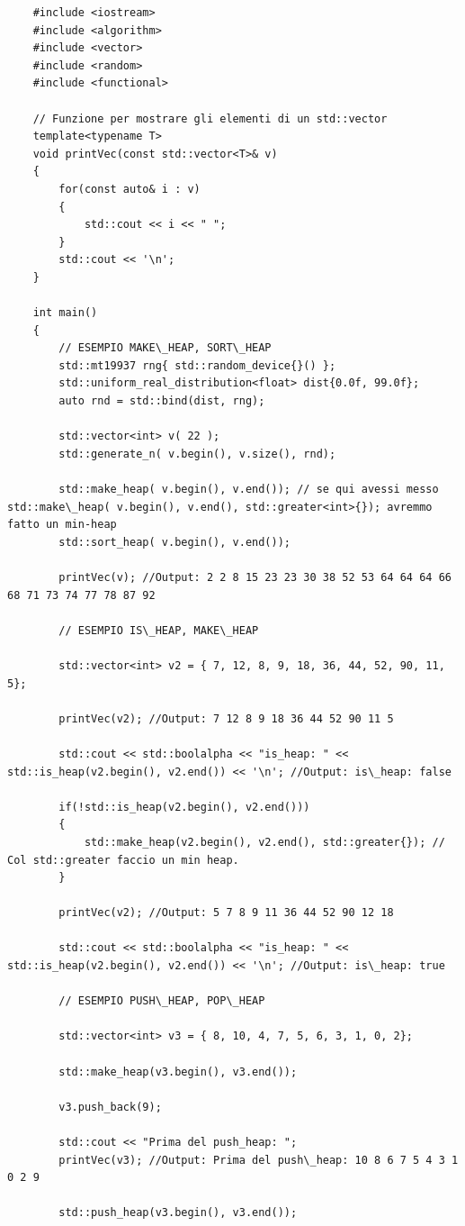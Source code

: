 \begin{lstlisting}
	#include <iostream>
	#include <algorithm>
	#include <vector>
	#include <random>
	#include <functional>
	
	// Funzione per mostrare gli elementi di un std::vector
	template<typename T>
	void printVec(const std::vector<T>& v)
	{
		for(const auto& i : v)
		{
			std::cout << i << " ";
		}
		std::cout << '\n';
	}
	
	int main()
	{
		// ESEMPIO MAKE\_HEAP, SORT\_HEAP
		std::mt19937 rng{ std::random_device{}() };
		std::uniform_real_distribution<float> dist{0.0f, 99.0f};
		auto rnd = std::bind(dist, rng);
		
		std::vector<int> v( 22 );
		std::generate_n( v.begin(), v.size(), rnd);
		
		std::make_heap( v.begin(), v.end()); // se qui avessi messo std::make\_heap( v.begin(), v.end(), std::greater<int>{}); avremmo fatto un min-heap
		std::sort_heap( v.begin(), v.end());
		
		printVec(v); //Output: 2 2 8 15 23 23 30 38 52 53 64 64 64 66 68 71 73 74 77 78 87 92
		
		// ESEMPIO IS\_HEAP, MAKE\_HEAP
		
		std::vector<int> v2 = { 7, 12, 8, 9, 18, 36, 44, 52, 90, 11, 5};
		
		printVec(v2); //Output: 7 12 8 9 18 36 44 52 90 11 5
		
		std::cout << std::boolalpha << "is_heap: " << std::is_heap(v2.begin(), v2.end()) << '\n'; //Output: is\_heap: false
		
		if(!std::is_heap(v2.begin(), v2.end()))
		{
			std::make_heap(v2.begin(), v2.end(), std::greater{}); // Col std::greater faccio un min heap.
		}
	
		printVec(v2); //Output: 5 7 8 9 11 36 44 52 90 12 18
	
		std::cout << std::boolalpha << "is_heap: " << std::is_heap(v2.begin(), v2.end()) << '\n'; //Output: is\_heap: true
		
		// ESEMPIO PUSH\_HEAP, POP\_HEAP
		
		std::vector<int> v3 = { 8, 10, 4, 7, 5, 6, 3, 1, 0, 2};
		
		std::make_heap(v3.begin(), v3.end());
		
		v3.push_back(9);
		
		std::cout << "Prima del push_heap: ";
		printVec(v3); //Output: Prima del push\_heap: 10 8 6 7 5 4 3 1 0 2 9
		
		std::push_heap(v3.begin(), v3.end());
		

\end{lstlisting}
